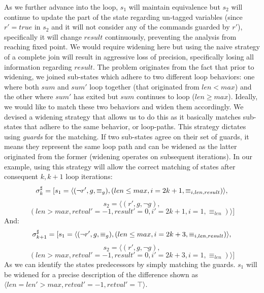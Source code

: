 As we further advance into the loop, $s_1$ will maintain equivalence but $s_2$ will continue to update the part of the state regarding un-tagged variables  (since $r'=true$ in $s_2$ and it will not consider any of the commands guarded by $r'$), specifically it will change $result$ continuously, preventing the analysis from reaching fixed point. We would require widening here but using the naive strategy of a complete join will result in aggressive loss of precision, specifically losing all information regarding $result$. The problem originates from the fact that prior to widening, we joined sub-states which adhere to two different loop behaviors: one where both $sum$ and $sum'$ loop together (that originated from $len < max$) and the other where $sum'$ has exited but $sum$ continues to loop ($len \geq max$). Ideally, we would like to match these two behaviors and widen them accordingly. We devised a widening strategy that allows us to do this as it basically matches sub-states that adhere to the same behavior, or loop-paths. This strategy dictates using \emph{guards} for the matching. If two sub-states agree on their set of guards, it means they represent the same loop path and can be widened as the latter originated from the former (widening operates on subsequent iterations). In our example, using this strategy will allow the correct matching of states after consequent $k, k+1$ loop iterations:
{\footnotesize
\[
\sigma^\sharp_{k} = [ s_1 = \langle (\neg r',g,\equiv_{g}),(len \leq max, i = 2k + 1, \equiv_{i,len,result}) \rangle,
\]
\[
s_2 = \langle (r',g,\neg g),
\]
\[
(len > max, retval' = -1, result' = 0, i' = 2k + 1, i = 1, \equiv_{len}) \rangle ]
\]
}
{\footnotesize
And:
\[
\sigma^\sharp_{k+1} = [ s_1 = \langle (\neg r',g,\equiv_{g}),(len \leq max, i = 2k + 3, \equiv_{i,len,result}) \rangle,
\]
\[
s_2 = \langle (r',g,\neg g),
\]
\[
(len > max, retval' = -1, result' = 0, i' = 2k + 3, i = 1, \equiv_{len}) \rangle ]
\]
}
As we can identify the states predecessors by simply matching the guards. $s_1$ will be widened for a precise description of the difference shown as $\langle len = len' > max, retval' = -1, retval' = \top \rangle$.

